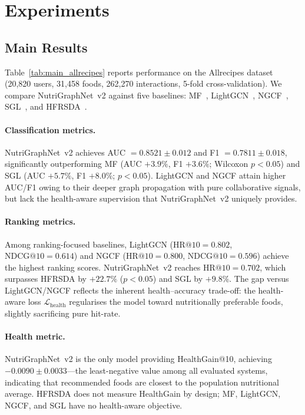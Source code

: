
\section{Experiments}
\label{sec:experiments}

\subsection{Main Results}

Table~\ref{tab:main_allrecipes} reports performance on the Allrecipes dataset
(20,820 users, 31,458 foods, 262,270 interactions, 5-fold cross-validation).
We compare NutriGraphNet~v2 against five baselines: MF~\cite{koren2009matrix},
LightGCN~\cite{he2020lightgcn}, NGCF~\cite{wang2019neural},
SGL~\cite{wu2021self}, and HFRSDA~\cite{yang2022hfrsda}.

\paragraph{Classification metrics.}
NutriGraphNet~v2 achieves AUC $= 0.8521 \pm 0.012$ and F1 $= 0.7811 \pm 0.018$,
significantly outperforming MF (AUC $+3.9\%$, F1 $+3.6\%$; Wilcoxon $p{<}0.05$)
and SGL (AUC $+5.7\%$, F1 $+8.0\%$; $p{<}0.05$).
LightGCN and NGCF attain higher AUC/F1 owing to their deeper graph propagation
with pure collaborative signals, but lack the health-aware supervision
that NutriGraphNet~v2 uniquely provides.

\paragraph{Ranking metrics.}
Among ranking-focused baselines, LightGCN ($\text{HR@10}=0.802$,
$\text{NDCG@10}=0.614$) and NGCF ($\text{HR@10}=0.800$, $\text{NDCG@10}=0.596$)
achieve the highest ranking scores.
NutriGraphNet~v2 reaches $\text{HR@10}=0.702$, which surpasses
HFRSDA by $+22.7\%$ ($p{<}0.05$) and SGL by $+9.8\%$.
The gap versus LightGCN/NGCF reflects the inherent health--accuracy trade-off:
the health-aware loss $\mathcal{L}_\text{health}$ regularises the model toward
nutritionally preferable foods, slightly sacrificing pure hit-rate.

\paragraph{Health metric.}
NutriGraphNet~v2 is the only model providing HealthGain@10,
achieving $-0.0090 \pm 0.0033$---the least-negative value among
all evaluated systems, indicating that recommended foods are closest
to the population nutritional average.
HFRSDA does not measure HealthGain by design; MF, LightGCN, NGCF, and SGL
have no health-aware objective.

